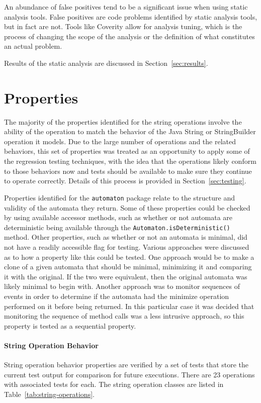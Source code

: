 \documentclass[letterpaper,sigplan]{acmart}
\begin{document}
An abundance of false positives tend to be a significant issue when using
static analysis tools.  False positives are code problems identified by static
analysis tools, but in fact are not.  Tools like Coverity allow for analysis
tuning, which is the process of changing the scope of the analysis or the
definition of what constitutes an actual problem.

Results of the static analysis are discussed in Section~\ref{sec:results}.


\section{Properties}\label{sec:properties}

The majority of the properties identified for the string operations involve the
ability of the operation to match the behavior of the Java String or
StringBuilder operation it models.  Due to the large number of operations and
the related behaviors, this set of properties was treated as an opportunity to
apply some of the regression testing techniques, with the idea that the
operations likely conform to those behaviors now and tests should be available
to make sure they continue to operate correctly.  Details of this process is
provided in Section~\ref{sec:testing}.

Properties identified for the \lstinline{automaton} package relate to the
structure and validity of the automata they return.  Some of these properties
could be checked by using available accessor methods, such as whether or not
automata are deterministic being available through the
\lstinline{Automaton.isDeterministic()} method.  Other properties, such as
whether or not an automata is minimal, did not have a readily accessible flag
for testing.  Various approaches were discussed as to how a property like this
could be tested.  One approach would be to make a clone of a given automata
that should be minimal, minimizing it and comparing it with the original.  If
the two were equivalent, then the original automata was likely minimal to begin
with.  Another approach was to monitor sequences of events in order to
determine if the automata had the minimize operation performed on it before
being returned.  In this particular case it was decided that monitoring the
sequence of method calls was a less intrusive approach, so this property is
tested as a sequential property.

\paragraph{String Operation Behavior} String operation behavior properties are
verified by a set of tests that store the current test output for comparison
for future executions. There are 23 operations with associated tests for
each. The string operation classes are listed in
Table~\ref{tab:string-operations}.
\end{document}

